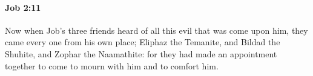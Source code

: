 
		\paragraph{Job 2:11} %
			\label{JOB-2-11}

			Now when Job’s three friends heard of all this evil that was come upon him, they came every one from his own place; Eliphaz the Temanite, and Bildad the Shuhite, and Zophar the Naamathite: for they had made an appointment together to come to mourn with him and to comfort him.


